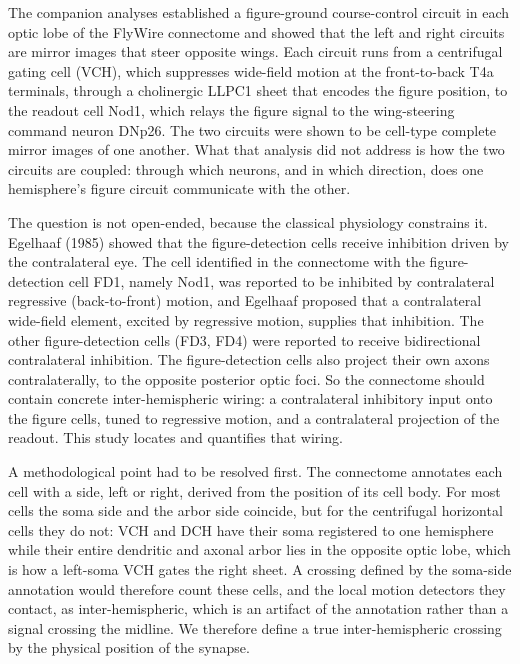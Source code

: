 \documentclass[11pt]{article}
\begin{document}
The companion analyses established a figure-ground course-control circuit in each optic lobe of
the FlyWire connectome and showed that the left and right circuits are mirror images that steer
opposite wings. Each circuit runs from a centrifugal gating cell (VCH), which suppresses
wide-field motion at the front-to-back T4a terminals, through a cholinergic LLPC1 sheet that
encodes the figure position, to the readout cell Nod1, which relays the figure signal to the
wing-steering command neuron DNp26. The two circuits were shown to be cell-type complete mirror
images of one another. What that analysis did not address is how the two circuits are coupled:
through which neurons, and in which direction, does one hemisphere's figure circuit communicate
with the other.

The question is not open-ended, because the classical physiology constrains it. Egelhaaf (1985)
showed that the figure-detection cells receive inhibition driven by the contralateral eye. The
cell identified in the connectome with the figure-detection cell FD1, namely Nod1, was reported
to be inhibited by contralateral regressive (back-to-front) motion, and Egelhaaf proposed that a
contralateral wide-field element, excited by regressive motion, supplies that inhibition. The
other figure-detection cells (FD3, FD4) were reported to receive bidirectional contralateral
inhibition. The figure-detection cells also project their own axons contralaterally, to the
opposite posterior optic foci. So the connectome should contain concrete inter-hemispheric
wiring: a contralateral inhibitory input onto the figure cells, tuned to regressive motion, and a
contralateral projection of the readout. This study locates and quantifies that wiring.

A methodological point had to be resolved first. The connectome annotates each cell with a side,
left or right, derived from the position of its cell body. For most cells the soma side and the
arbor side coincide, but for the centrifugal horizontal cells they do not: VCH and DCH have their
soma registered to one hemisphere while their entire dendritic and axonal arbor lies in the
opposite optic lobe, which is how a left-soma VCH gates the right sheet. A crossing defined by the
soma-side annotation would therefore count these cells, and the local motion detectors they
contact, as inter-hemispheric, which is an artifact of the annotation rather than a signal
crossing the midline. We therefore define a true inter-hemispheric crossing by the physical
position of the synapse.
\end{document}
